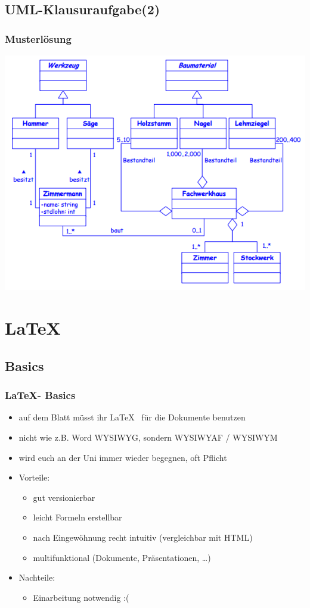 \documentclass[18pt]{beamer}
\begin{document}
	\subsection{UML-Klausuraufgabe(2)}
	\begin{frame}
		\frametitle{Musterlösung}
		\includegraphics[scale=0.48]{./pics/tut1/solution.png}
	\end{frame}
		
		
\section{\LaTeX}
	\subsection{Basics}
	\begin{frame}
		\frametitle{\LaTeX - Basics}
		\begin{itemize}
			\item auf dem Blatt müsst ihr \LaTeX  ~ für die Dokumente benutzen
			\item nicht wie z.B. Word WYSIWYG, sondern WYSIWYAF / WYSIWYM
			\item wird euch an der Uni immer wieder begegnen, oft Pflicht
			\pause
			\item Vorteile:
			\begin{itemize}
				\item gut versionierbar
				\item leicht Formeln erstellbar
				\item nach Eingewöhnung recht intuitiv (vergleichbar mit HTML)
				\item multifunktional (Dokumente, Präsentationen, \dots)
			\end{itemize}
			\pause
			\item Nachteile:
			\begin{itemize}
				\item Einarbeitung notwendig :(
			\end{itemize}
		\end{itemize}
	\end{frame}
	
\end{document}
